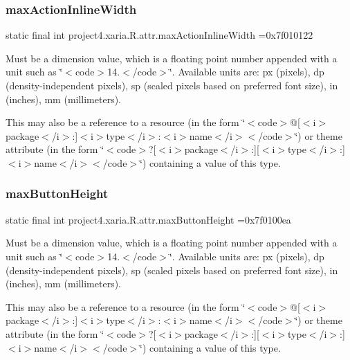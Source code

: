\subsubsection{\texorpdfstring{max\+Action\+Inline\+Width}{maxActionInlineWidth}}
{\footnotesize\ttfamily static final int project4.\+xaria.\+R.\+attr.\+max\+Action\+Inline\+Width =0x7f010122\hspace{0.3cm}{\ttfamily [static]}}

Must be a dimension value, which is a floating point number appended with a unit such as \char`\"{}$<$code$>$14.\+5sp$<$/code$>$\char`\"{}. Available units are\+: px (pixels), dp (density-\/independent pixels), sp (scaled pixels based on preferred font size), in (inches), mm (millimeters). 

This may also be a reference to a resource (in the form \char`\"{}$<$code$>$@\mbox{[}$<$i$>$package$<$/i$>$\+:\mbox{]}$<$i$>$type$<$/i$>$\+:$<$i$>$name$<$/i$>$$<$/code$>$\char`\"{}) or theme attribute (in the form \char`\"{}$<$code$>$?\mbox{[}$<$i$>$package$<$/i$>$\+:\mbox{]}\mbox{[}$<$i$>$type$<$/i$>$\+:\mbox{]}$<$i$>$name$<$/i$>$$<$/code$>$\char`\"{}) containing a value of this type. \mbox{\label{classproject4_1_1xaria_1_1R_1_1attr_aae4378b5d9b6ee4c1c76ab18aa350ae0}} 
\subsubsection{\texorpdfstring{max\+Button\+Height}{maxButtonHeight}}
{\footnotesize\ttfamily static final int project4.\+xaria.\+R.\+attr.\+max\+Button\+Height =0x7f0100ea\hspace{0.3cm}{\ttfamily [static]}}

Must be a dimension value, which is a floating point number appended with a unit such as \char`\"{}$<$code$>$14.\+5sp$<$/code$>$\char`\"{}. Available units are\+: px (pixels), dp (density-\/independent pixels), sp (scaled pixels based on preferred font size), in (inches), mm (millimeters). 

This may also be a reference to a resource (in the form \char`\"{}$<$code$>$@\mbox{[}$<$i$>$package$<$/i$>$\+:\mbox{]}$<$i$>$type$<$/i$>$\+:$<$i$>$name$<$/i$>$$<$/code$>$\char`\"{}) or theme attribute (in the form \char`\"{}$<$code$>$?\mbox{[}$<$i$>$package$<$/i$>$\+:\mbox{]}\mbox{[}$<$i$>$type$<$/i$>$\+:\mbox{]}$<$i$>$name$<$/i$>$$<$/code$>$\char`\"{}) containing a value of this type. \mbox{\label{classproject4_1_1xaria_1_1R_1_1attr_adea6c7a4f2f29b21e559fe2cdc96d23c}} 
